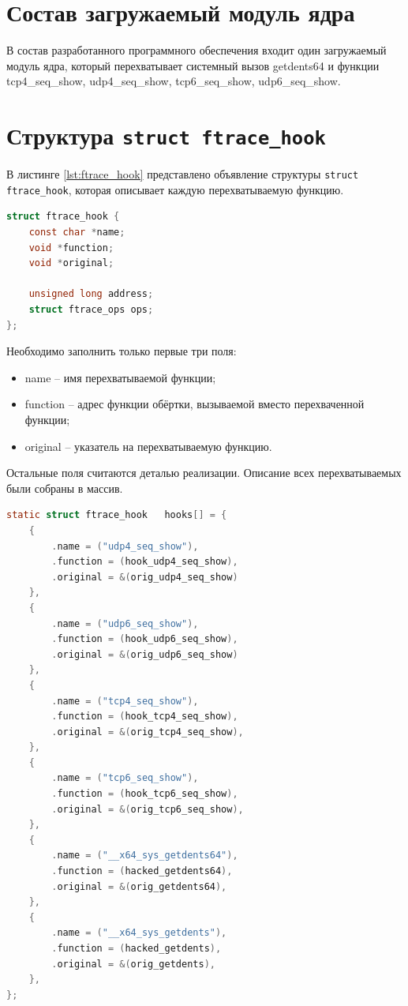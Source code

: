 \section{Состав загружаемый модуль ядра}%
\label{sec:sostav_programmnogo_obespecheniia}

В состав разработанного программного обеспечения входит один загружаемый модуль ядра, который перехватывает системный вызов getdents64 и функции tcp4\_seq\_show, udp4\_seq\_show, tcp6\_seq\_show, udp6\_seq\_show.

\section{Структура \texttt{struct ftrace\_hook}}

В листинге \ref{lst:ftrace_hook} представлено объявление структуры \texttt{struct ftrace\_hook}, которая описывает каждую перехватываемую функцию.\\

\begin{lstlisting}[label=lst:ftrace_hook, caption=Листинг структуры ftrace\_hook, language=c]
struct ftrace_hook {
	const char *name;
	void *function;
	void *original;
	
	unsigned long address;
	struct ftrace_ops ops;
};
\end{lstlisting}


Необходимо заполнить только первые три поля:

\begin{itemize}
	\item name – имя перехватываемой функции;
	\item function – адрес функции обёртки, вызываемой вместо перехваченной функции;
	\item original – указатель на перехватываемую функцию.
\end{itemize}

Остальные поля считаются деталью реализации. Описание всех перехватываемых были собраны в массив.

\begin{lstlisting}[label=lst:ftrace-array, caption=Объявление массива перехватываемых функций и специальный макрос для его инициализации, language=c]
static struct ftrace_hook	hooks[] = {
	{
		.name = ("udp4_seq_show"),
		.function = (hook_udp4_seq_show),
		.original = &(orig_udp4_seq_show)
	},
	{
		.name = ("udp6_seq_show"),
		.function = (hook_udp6_seq_show),
		.original = &(orig_udp6_seq_show)
	},
	{
		.name = ("tcp4_seq_show"),
		.function = (hook_tcp4_seq_show),
		.original = &(orig_tcp4_seq_show),
	},
	{
		.name = ("tcp6_seq_show"),
		.function = (hook_tcp6_seq_show),
		.original = &(orig_tcp6_seq_show),
	},
	{
		.name = ("__x64_sys_getdents64"),
		.function = (hacked_getdents64),
		.original = &(orig_getdents64),
	},
	{
		.name = ("__x64_sys_getdents"),
		.function = (hacked_getdents),
		.original = &(orig_getdents),
	},
};
\end{lstlisting}


